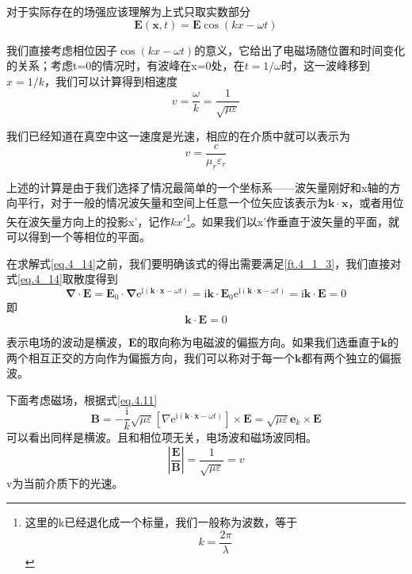         对于实际存在的场强应该理解为上式只取实数部分
        \begin{equation}
            \label{eq.4_14}
            \boldsymbol{E}(\boldsymbol{x}, t)= \boldsymbol{E} \cos(kx-\omega t)
        \end{equation}

        我们直接考虑相位因子$\cos (kx - \omega t)$的意义，它给出了电磁场随位置和时间变化的关系；考虑t=0的情况时，有波峰在x=0处，在$t=1/\omega$时，这一波峰移到$x=1/k$，我们可以计算得到相速度
        \begin{equation}
            \label{eq.4_16}
            v=\frac{\omega}{k}=\frac{1}{\sqrt{\mu \varepsilon}}
        \end{equation}    

        我们已经知道在真空中这一速度是光速，相应的在介质中就可以表示为
        \begin{equation}
            v=\frac{c}{\mu_r \varepsilon_r}
        \end{equation}

        上述的计算是由于我们选择了情况最简单的一个坐标系——波矢量刚好和x轴的方向平行，对于一般的情况波矢量和空间上任意一个位矢应该表示为$\boldsymbol{k} \cdot \boldsymbol{x}$，或者用位矢在波矢量方向上的投影x'，记作$k x'$\footnote{这里的k已经退化成一个标量，我们一般称为波数，等于\[k= \frac{2 \pi}{\lambda}\]}。如果我们以x’作垂直于波矢量的平面，就可以得到一个等相位的平面。
        
        在求解式\ref{eq.4_14}之前，我们要明确该式的得出需要满足\ref{ft.4_1_3}，我们直接对式\ref{eq.4_14}取散度得到
        \begin{equation}
            \boldsymbol{\nabla} \cdot \boldsymbol{E}=\boldsymbol{E}_{0} \cdot \boldsymbol{\nabla} \mathrm{e}^{\mathrm{i}(\boldsymbol{k} \cdot \boldsymbol{x}-\omega t)}=\mathrm{i} \boldsymbol{k} \cdot \boldsymbol{E}_{0} \mathrm{e}^{\mathrm{i}(\boldsymbol{k} \cdot \boldsymbol{x}-\omega t)}=\mathrm{i} \boldsymbol{k} \cdot \boldsymbol{E}=0
        \end{equation} 
        即
        \begin{equation}
            \boldsymbol{k} \cdot \boldsymbol{E} = 0
        \end{equation}

        表示电场的波动是横波，$\boldsymbol{E}$的取向称为电磁波的偏振方向。如果我们选垂直于$\boldsymbol{k}$的两个相互正交的方向作为偏振方向，我们可以称对于每一个$\boldsymbol{k}$都有两个独立的偏振波。

        下面考虑磁场，根据式\ref{eq.4.11}
        \begin{equation}
            \label{eq.4_20}
            \boldsymbol{B} = -\frac{\mathrm{i}}{k} \sqrt{\mu \varepsilon} [\nabla \mathrm{e}^{\mathrm{i}(\boldsymbol{k} \cdot \boldsymbol{x}-\omega t)}] \times \boldsymbol{E} = \sqrt{\mu \varepsilon}\boldsymbol{e}_k \times \boldsymbol{E}
        \end{equation}
        可以看出同样是横波。且和相位项无关，电场波和磁场波同相。
        \begin{equation}
            \label{eq.4_21}
            \left|\frac{\boldsymbol{E}}{\boldsymbol{B}}\right|=\frac{1}{\sqrt{\mu \varepsilon}}=v
        \end{equation}
        v为当前介质下的光速。
